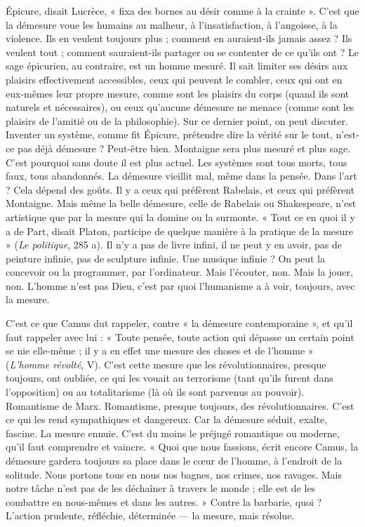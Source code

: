Épicure, disait Lucrèce, « fixa des bornes au désir comme à la crainte ».
C’est que la démesure voue les humains au malheur, à l’insatisfaction, à
l'angoisse, à la violence. Ils en veulent toujours plus ; comment en auraient-ils
jamais assez ? Ils veulent tout ; comment sauraient-ils partager ou se contenter
de ce qu’ils ont ? Le sage épicurien, au contraire, est un homme mesuré. Il sait
limiter ses désirs aux plaisirs effectivement accessibles, ceux qui peuvent le combler,
ceux qui ont en eux-mêmes leur propre mesure, comme sont les plaisirs
du corps (quand ils sont naturels et nécessaires), ou ceux qu'aucune démesure
ne menace (comme sont les plaisirs de l’amitié ou de la philosophie). Sur ce
dernier point, on peut discuter. Inventer un système, comme fit Épicure, prétendre
dire la vérité sur le tout, n’est-ce pas déjà démesure ? Peut-être bien.
Montaigne sera plus mesuré et plus sage. C’est pourquoi sans doute il est plus
actuel. Les systèmes sont tous morts, tous faux, tous abandonnés. La démesure
vieillit mal, même dans la pensée. Dans l’art ? Cela dépend des goûts. Il y a
ceux qui préfèrent Rabelais, et ceux qui préfèrent Montaigne. Mais même la
belle démesure, celle de Rabelais ou Shakespeare, n’est artistique que par la
mesure qui la domine ou la surmonte. « Tout ce en quoi il y a de Part, disait
Platon, participe de quelque manière à la pratique de la mesure » ({\it Le politique},
285 a). Il n’y a pas de livre infini, il ne peut y en avoir, pas de peinture infinie,
pas de sculpture infinie. Une musique infinie ? On peut la concevoir ou la programmer,
par l'ordinateur. Mais l'écouter, non. Mais la jouer, non. L'homme
n’est pas Dieu, c’est par quoi l’humanisme a à voir, toujours, avec la mesure.

C’est ce que Camus dut rappeler, contre « la démesure contemporaine », et
qu’il faut rappeler avec lui : « Toute pensée, toute action qui dépasse un certain
point se nie elle-même ; il y a en effet une mesure des choses et de l’homme »
({\it L'homme révolté}, V). C’est cette mesure que les révolutionnaires, presque toujours,
ont oubliée, ce qui les vouait au terrorisme (tant qu’ils furent dans
l’opposition) ou au totalitarisme (là où ils sont parvenus au pouvoir). Romantisme
de Marx. Romantisme, presque toujours, des révolutionnaires. C’est ce
qui les rend sympathiques et dangereux. Car la démesure séduit, exalte, fascine.
La mesure ennuie. C’est du moins le préjugé romantique ou moderne, qu’il
faut comprendre et vaincre. « Quoi que nous fassions, écrit encore Camus, la
démesure gardera toujours sa place dans le cœur de l’homme, à l’endroit de la
solitude. Nous portons tous en nous nos bagnes, nos crimes, nos ravages. Mais
notre tâche n’est pas de les déchaîner à travers le monde ; elle est de les combattre
en nous-mêmes et dans les autres. » Contre la barbarie, quoi ? L’action
prudente, réfléchie, déterminée — la mesure, mais résolue.

